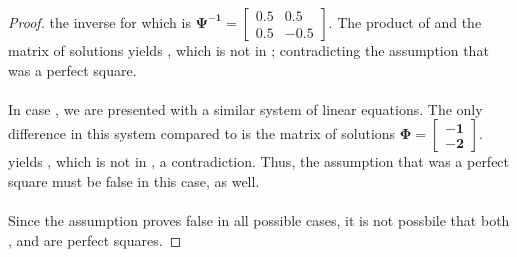\documentclass[a4paper, 12pt]{article}
\theoremstyle{plain}
\begin{document}
\begin{proof}
    the inverse for which is
    $\bm{\Psi^{-1} =} \left[\begin{smallmatrix}
        \bm{0.5} & \bm{0.5} \\
        \bm{0.5} & \bm{-0.5}
    \end{smallmatrix}\right]$. 
    The product of  and the matrix of solutions yields , 
    which is not in ; 
    contradicting the assumption that  was a perfect square.
    \\ \\ 
    In case , 
    we are presented with a similar system of linear equations. 
    The only difference in this system compared to  is the matrix of solutions 
    $\bm{\Phi =} \left[\begin{smallmatrix}
        \bm{-1} \\
        \bm{-2}
    \end{smallmatrix}\right]$. 
     yields , 
    which is not in , 
    a contradiction. 
    Thus, the assumption that  was a perfect square must be false in this case, as well.
    \\ \\
    Since the assumption proves false in all possible cases, 
    it is not possbile that both , and \bm{$\eta$} are perfect squares.
\color{lightgray} \end{proof}
\pagebreak
\end{document}

